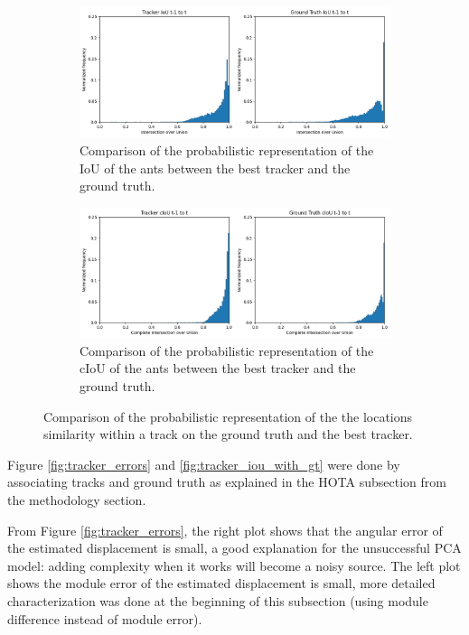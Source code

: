 \begin{figure}[!hp]
	\centering
	\begin{subfigure}[]{0.9\textwidth}
		\includegraphics[width=\textwidth]{figures/06_results/da/Tracker_iou_vs_gt.png}
		\caption{\footnotesize{Comparison of the probabilistic representation of the IoU of the ants between the best tracker and the ground truth.}}
		\label{fig:tracks_iou}
	\end{subfigure}
	\begin{subfigure}[]{0.9\textwidth}
		\includegraphics[width=\textwidth]{figures/06_results/da/Tracker_ciou_vs_gt.png}
		\caption{\footnotesize{Comparison of the probabilistic representation of the cIoU of the ants between the best tracker and the ground truth.}}
		\label{fig:tracks_ciou}
	\end{subfigure}
	\caption[Location metrics between frames]{\footnotesize{Comparison of the probabilistic representation of the the locations similarity within a track on the ground truth and the best tracker.}}
	\label{fig:tracks_location}
\end{figure}

\needspace{0.1\textheight}

{
	Figure \ref{fig:tracker_errors} and \ref{fig:tracker_iou_with_gt} were done by associating tracks and ground truth as explained in the HOTA subsection from the methodology section.
}

{
    From Figure \ref{fig:tracker_errors}, the right plot shows that the angular error of the estimated displacement is small, 
	a good explanation for the unsuccessful PCA model: adding complexity when it works will become a noisy source. 
	The left plot shows the module error of the estimated displacement is small, more detailed characterization was done at the beginning of this subsection (using module difference instead of module error).
}

